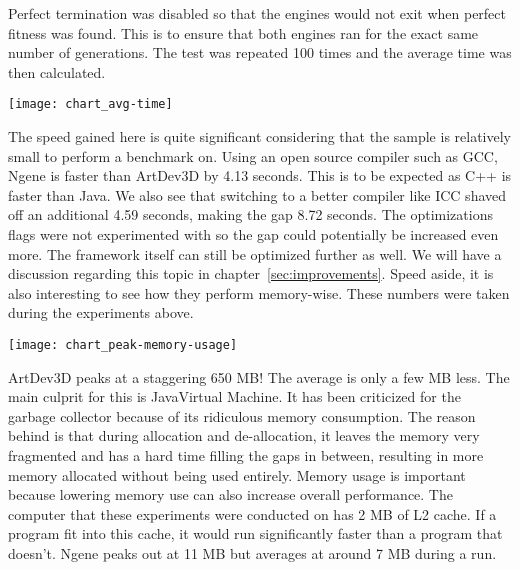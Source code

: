 Perfect termination was disabled so that the engines would not exit when perfect fitness was found. This is to ensure that both engines ran for the exact same number of generations. The test was repeated 100 times and the average time was then calculated.

\begin{center}\texttt{[image: chart\_avg-time]}\end{center}

The speed gained here is quite significant considering that the sample is relatively small to perform a benchmark on. Using an open source compiler such as GCC, Ngene is faster than ArtDev3D by 4.13 seconds. This is to be expected as C++ is faster than Java. We also see that switching to a better compiler like ICC shaved off an additional 4.59 seconds, making the gap 8.72 seconds. The optimizations flags were not experimented with so the gap could potentially be increased even more. The framework itself can still be optimized further as well. We will have a discussion regarding this topic in chapter~\ref{sec:improvements}. Speed aside, it is also interesting to see how they perform memory-wise. These numbers were taken during the experiments above.

\begin{center}\texttt{[image: chart\_peak-memory-usage]}\end{center}

ArtDev3D peaks at a staggering 650 MB! The average is only a few MB less. The main culprit for this is Java\texttrademark Virtual Machine. It has been criticized\cite{maio2008} for the garbage collector because of its ridiculous memory consumption. The reason behind is that during allocation and de-allocation, it leaves the memory very fragmented and has a hard time filling the gaps in between, resulting in more memory allocated without being used entirely. Memory usage is important because lowering memory use can also increase overall performance. The computer that these experiments were conducted on has 2 MB of L2 cache. If a program fit into this cache, it would run significantly faster than a program that doesn't. Ngene peaks out at 11 MB but averages at around 7 MB during a run.

